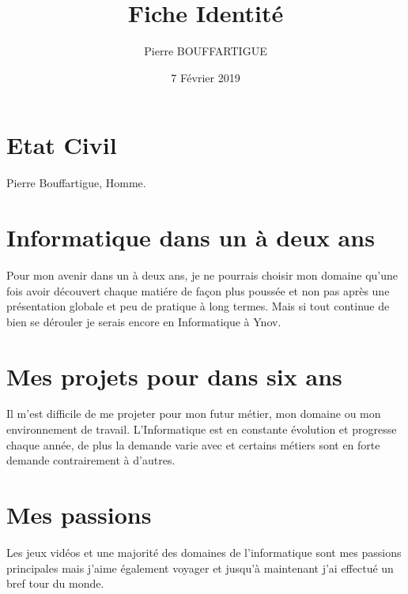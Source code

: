 \documentclass{article}
\title{Fiche Identité}
\author{Pierre BOUFFARTIGUE}
\date{7 Février 2019}
\begin{document}
\maketitle
\section{Etat Civil}
Pierre Bouffartigue, Homme.
\maketitle
\section{Informatique dans un à deux ans}
Pour mon avenir dans un à deux ans, je ne pourrais choisir mon domaine qu'une fois avoir découvert chaque matiére de façon plus poussée et non pas après une présentation globale et peu de pratique à long termes. Mais si tout continue de bien se dérouler je serais encore en Informatique à Ynov.
\maketitle
\section{Mes projets pour dans six ans}

Il m'est difficile de me projeter pour mon futur métier, mon domaine ou mon environnement de travail. L'Informatique est en constante évolution et progresse chaque année, de plus la demande varie avec et certains métiers sont en forte demande contrairement à d'autres. 

\maketitle
\section{Mes passions}
Les jeux vidéos et une majorité des domaines de l'informatique sont mes passions principales mais j'aime également voyager et jusqu'à maintenant j'ai effectué un bref tour du monde.
\end{document}
